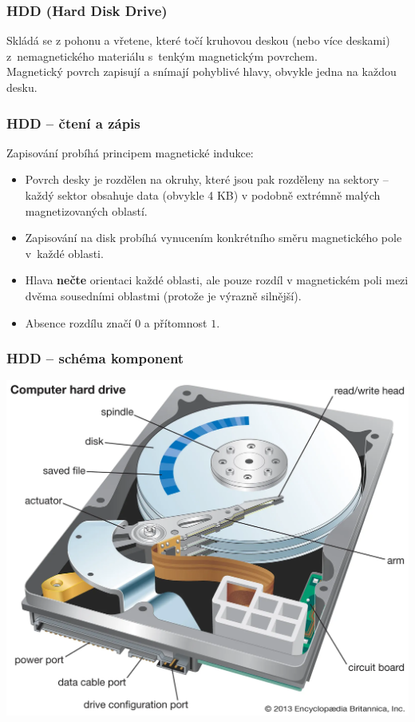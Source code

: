 \documentclass[aspectratio=169,11pt,svgnames,handout]{beamer}
\begin{document}
\begin{frame}
 \frametitle{HDD (\textbf{H}ard \textbf{D}isk \textbf{D}rive)}
 Skládá se z pohonu a vřetene, které točí kruhovou deskou (nebo více deskami)
 z~nemagnetického materiálu s~tenkým magnetickým povrchem.\\
 \pause
 Magnetický povrch zapisují a snímají pohyblivé hlavy, obvykle jedna na každou
 desku.
\end{frame}

\begin{frame}
 \frametitle{HDD -- čtení a zápis}
 Zapisování probíhá principem magnetické indukce:
 \begin{itemize}[label=\textbullet]
  \item Povrch desky je rozdělen na okruhy, které jsou pak rozděleny na sektory
   -- každý sektor obsahuje data (obvykle 4 KB) v podobně extrémně malých
   magnetizovaných oblastí.
  \pause
  \item Zapisování na disk probíhá vynucením konkrétního směru magnetického pole
   v~každé oblasti.
   \pause
  \item Hlava \textbf{nečte} orientaci každé oblasti, ale pouze rozdíl v
   magnetickém poli mezi dvěma sousedními oblastmi (protože je výrazně silnější).
  \pause
  \item Absence rozdílu značí $0$ a přítomnost $1$.
 \end{itemize}
\end{frame}

\begin{frame}
 \frametitle{HDD -- schéma komponent}
 \begin{center}
  \includegraphics[width=.6\textwidth]{hdd_big.webp}
 \end{center}
\end{frame}
\end{document}
